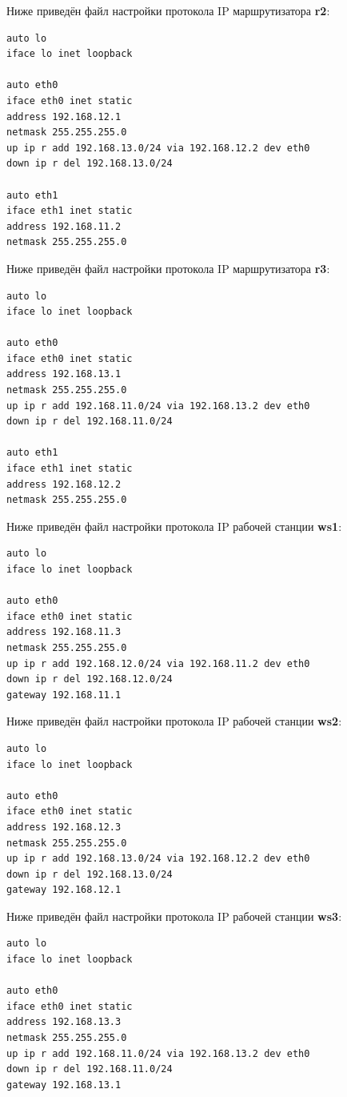 \documentclass[a4paper,12pt]{article}
\begin{document}
Ниже приведён файл настройки протокола IP маршрутизатора \textbf{r2}:

\begin{Verbatim}
auto lo
iface lo inet loopback

auto eth0
iface eth0 inet static
address 192.168.12.1
netmask 255.255.255.0
up ip r add 192.168.13.0/24 via 192.168.12.2 dev eth0
down ip r del 192.168.13.0/24

auto eth1
iface eth1 inet static
address 192.168.11.2
netmask 255.255.255.0
\end{Verbatim}

Ниже приведён файл настройки протокола IP маршрутизатора \textbf{r3}:

\begin{Verbatim}
auto lo
iface lo inet loopback

auto eth0
iface eth0 inet static
address 192.168.13.1
netmask 255.255.255.0
up ip r add 192.168.11.0/24 via 192.168.13.2 dev eth0
down ip r del 192.168.11.0/24

auto eth1
iface eth1 inet static
address 192.168.12.2
netmask 255.255.255.0
\end{Verbatim}

Ниже приведён файл настройки протокола IP рабочей станции \textbf{ws1}:

\begin{Verbatim}
auto lo
iface lo inet loopback

auto eth0
iface eth0 inet static
address 192.168.11.3
netmask 255.255.255.0
up ip r add 192.168.12.0/24 via 192.168.11.2 dev eth0
down ip r del 192.168.12.0/24
gateway 192.168.11.1
\end{Verbatim}

Ниже приведён файл настройки протокола IP рабочей станции \textbf{ws2}:

\begin{Verbatim}
auto lo
iface lo inet loopback

auto eth0
iface eth0 inet static
address 192.168.12.3
netmask 255.255.255.0
up ip r add 192.168.13.0/24 via 192.168.12.2 dev eth0
down ip r del 192.168.13.0/24
gateway 192.168.12.1
\end{Verbatim}

Ниже приведён файл настройки протокола IP рабочей станции \textbf{ws3}:

\begin{Verbatim}
auto lo
iface lo inet loopback

auto eth0
iface eth0 inet static
address 192.168.13.3
netmask 255.255.255.0
up ip r add 192.168.11.0/24 via 192.168.13.2 dev eth0
down ip r del 192.168.11.0/24
gateway 192.168.13.1
\end{Verbatim}
\end{document}
